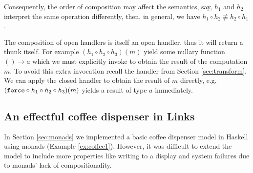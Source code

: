 Consequently, the order of composition may affect the semantics, say, $h_1$ and $h_2$ interpret the same operation differently, then, in general, we have $h_1 \circ h_2 \not\equiv h_2 \circ h_1$.

The composition of open handlers is itself an open handler, thus it will return a thunk itself. For example $(h_1 \circ h_2 \circ h_3)(m)$ yield some nullary function $() \to a$ which we must explicitly invoke to obtain the result of the computation $m$. To avoid this extra invocation recall the  handler from Section \ref{sec:transform}. We can apply the closed handler  to obtain the result of $m$ directly, e.g. $(\texttt{force} \circ h_1 \circ h_2 \circ h_3)(m)$ yields a result of type $a$ immediately.

\subsection{An effectful coffee dispenser in Links}
In Section \ref{sec:monads} we implemented a basic coffee dispenser model in Haskell using monads (Example \ref{ex:coffee1}). However, it was difficult to extend the model to include more properties like writing to a display and system failures due to monads' lack of compositionality.

